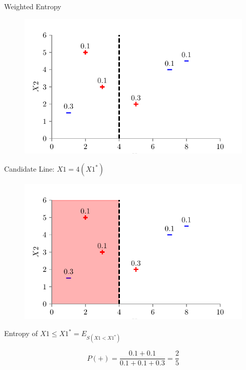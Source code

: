 \documentclass[usenames,dvipsnames]{beamer}
\begin{document}
	\begin{section}{Weighted Entropy}

	\begin{frame}
	
	\begin{figure}
		\centering
		\includegraphics{../assets/decision-trees/figures/dt_weighted/fig3.pdf}
	\end{figure}

	Candidate Line: \(X1 = 4 (X1^*)\)

	\end{frame}

	\begin{frame}
	\begin{figure}
		\centering
		\includegraphics{../assets/decision-trees/figures/dt_weighted/fig4.pdf}
	\end{figure}
	
	Entropy of \(X1 \leq X1^*  = E_{S(X1 < X1^*)}\)
	
	$$P(+) = \frac{0.1 + 0.1}{0.1 + 0.1 + 0.3} = \frac{2}{5}$$
	

\end{frame}
\end{section}
\end{document}
